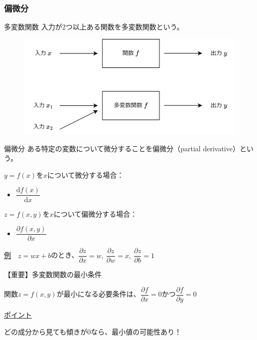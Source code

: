 \documentclass[dvipdfmx,aspectratio=169]{beamer}
\begin{document}
	\subsubsection{偏微分}
	\begin{frame}{多変数関数}
		入力が2つ以上ある関数を\alert{多変数関数}という。
		\begin{figure}
			\centering
			\includegraphics[width=0.7\linewidth]{img/explanation-of-mutivariate-function}
		\end{figure}
	\end{frame}
	\begin{frame}{偏微分}
		ある特定の変数について微分することを\alert{偏微分}（partial derivative）という。
		
		$ y=f(x) $を$ x $について微分する場合：
		\begin{itemize}
			\item $ \dfrac{\mathrm{d}f(x)}{\mathrm{d}x} $
		\end{itemize}
		
		$ z=f(x,y) $を$ x $について偏微分する場合：
		\begin{itemize}
			\item $ \dfrac{\partial f(x, y)}{\partial x} $
		\end{itemize}
	
		\underline{例}　$ z = wx+b $のとき、$ \dfrac{\partial z}{\partial x} = w,\ \dfrac{\partial z}{\partial w} = x,\ \dfrac{\partial z}{\partial b} = 1 $
	\end{frame}
	\begin{frame}{【重要】多変数関数の最小条件}
		\begin{screen}
			関数$ z = f(x, y) $が最小になる必要条件は、$ \dfrac{\partial f}{\partial x} = 0 $かつ$ \dfrac{\partial f}{\partial y} = 0 $
		\end{screen}
		\underline{ポイント}
		
		どの成分から見ても傾きが$ 0 $なら、最小値の可能性あり！
	\end{frame}
	
\end{document}
